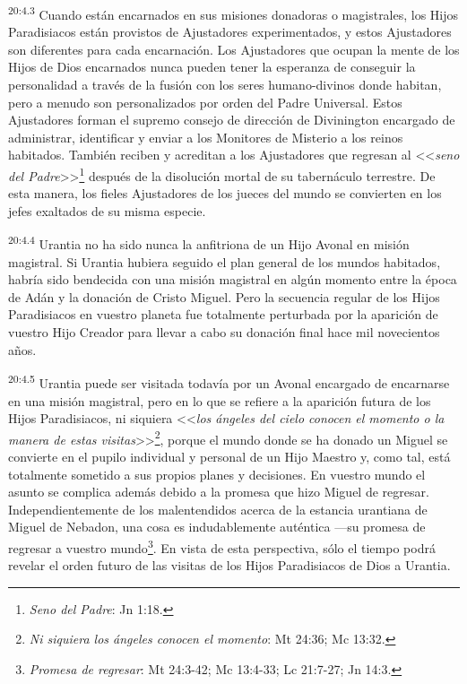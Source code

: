\par
\textsuperscript{20:4.3} Cuando están encarnados en sus misiones donadoras o magistrales, los Hijos Paradisiacos están provistos de Ajustadores experimentados, y estos Ajustadores son diferentes para cada encarnación. Los Ajustadores que ocupan la mente de los Hijos de Dios encarnados nunca pueden tener la esperanza de conseguir la personalidad a través de la fusión con los seres humano-divinos donde habitan, pero a menudo son personalizados por orden del Padre Universal. Estos Ajustadores forman el supremo consejo de dirección de Divinington encargado de administrar, identificar y enviar a los Monitores de Misterio a los reinos habitados. También reciben y acreditan a los Ajustadores que regresan al <<\textit{seno del Padre}>>\footnote{\textit{Seno del Padre}: Jn 1:18.} después de la disolución mortal de su tabernáculo terrestre. De esta manera, los fieles Ajustadores de los jueces del mundo se convierten en los jefes exaltados de su misma especie.

\par
\textsuperscript{20:4.4} Urantia no ha sido nunca la anfitriona de un Hijo Avonal en misión magistral. Si Urantia hubiera seguido el plan general de los mundos habitados, habría sido bendecida con una misión magistral en algún momento entre la época de Adán y la donación de Cristo Miguel. Pero la secuencia regular de los Hijos Paradisiacos en vuestro planeta fue totalmente perturbada por la aparición de vuestro Hijo Creador para llevar a cabo su donación final hace mil novecientos años.

\par
\textsuperscript{20:4.5} Urantia puede ser visitada todavía por un Avonal encargado de encarnarse en una misión magistral, pero en lo que se refiere a la aparición futura de los Hijos Paradisiacos, ni siquiera <<\textit{los ángeles del cielo conocen el momento o la manera de estas visitas}>>\footnote{\textit{Ni siquiera los ángeles conocen el momento}: Mt 24:36; Mc 13:32.}, porque el mundo donde se ha donado un Miguel se convierte en el pupilo individual y personal de un Hijo Maestro y, como tal, está totalmente sometido a sus propios planes y decisiones. En vuestro mundo el asunto se complica además debido a la promesa que hizo Miguel de regresar. Independientemente de los malentendidos acerca de la estancia urantiana de Miguel de Nebadon, una cosa es indudablemente auténtica ---su promesa de regresar a vuestro mundo\footnote{\textit{Promesa de regresar}: Mt 24:3-42; Mc 13:4-33; Lc 21:7-27; Jn 14:3.}. En vista de esta perspectiva, sólo el tiempo podrá revelar el orden futuro de las visitas de los Hijos Paradisiacos de Dios a Urantia.

